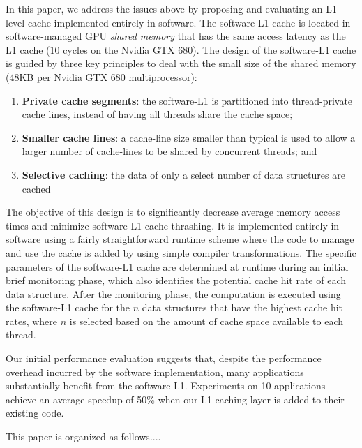 In this paper, we address the issues above by proposing and evaluating an L1-level cache implemented entirely in software.
The software-L1 cache is located in software-managed GPU \emph{shared memory} that has the same access latency as the L1 cache (10 cycles on the Nvidia GTX 680).
The design of the software-L1 cache is guided by three key principles to deal with the small size of the shared memory (48KB per Nvidia GTX 680 multiprocessor):
\begin{enumerate}
\item {\bf Private cache segments}: the software-L1 is partitioned into thread-private cache lines, instead of having all threads share the cache space; 
\item {\bf Smaller cache lines}: a cache-line size smaller than typical is used 
to allow a larger number of cache-lines to be shared by concurrent threads; and
\item {\bf Selective caching}: the data of only a select number of data structures are cached\end{enumerate}
The objective of this design is to significantly decrease average memory access times and minimize software-L1 cache thrashing.
It is implemented entirely in software using a fairly straightforward runtime scheme where the code to manage and use the cache is added by using simple compiler transformations.
The specific parameters of the software-L1 cache are determined at runtime during an initial brief monitoring phase, which also identifies the potential cache hit rate of each data structure.
After the monitoring phase, the computation is executed using the software-L1 cache for the $n$ data structures that have the highest cache hit rates, where $n$ is selected based on the amount of cache space available to each thread.

Our initial performance evaluation suggests that, despite the performance overhead incurred by the software implementation, many applications substantially benefit from the software-L1. 
Experiments on 10 applications achieve an average speedup of 50\% when our L1 caching layer is added to their existing code.

This paper is organized as follows....



